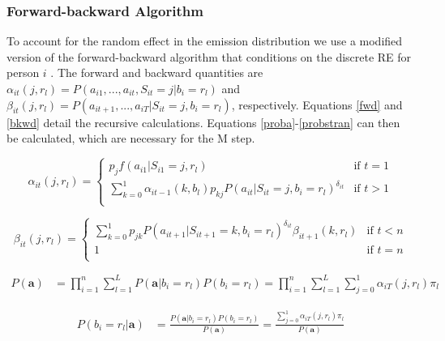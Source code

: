 \documentclass{article}
\begin{document}
\subsubsection{Forward-backward Algorithm}
To account for the random effect in the emission distribution we use a modified version of the forward-backward algorithm that conditions on the discrete RE for person $i$ \cite{Maruotti2011}. The forward and backward quantities are $\alpha_{it}(j,r_l) = P(a_{i1}, ..., a_{it}, S_{it} = j | b_i=r_l)$ and $\beta_{it}(j,r_l) =  P(a_{it+1}, ..., a_{iT} | S_{it} = j,b_i=r_l)$, respectively. Equations \ref{fwd} and \ref{bkwd} detail the recursive calculations. Equations \ref{proba}-\ref{probstran} can then be calculated, which are necessary for the M step.  
 
\begin{equation} \label{fwd}
\alpha_{it}(j,r_l) = \begin{cases}
    p_{j} f(a_{i1}|S_{i1}=j,r_l) & \text{if } t = 1 \\
    \sum_{k=0}^1 \alpha_{it-1} (k,b_l)p_{kj}P(a_{it}|S_{it}=j,b_i=r_l)^{\delta_{it}} 
        & \text{if } t > 1\\
\end{cases}
\end{equation}

\begin{equation} \label{bkwd}
\beta_{it}(j,r_l) = \begin{cases} 
    \sum_{k=0}^1p_{jk}P(a_{it+1}|S_{it+1}=k,b_i=r_l)^{\delta_{it}}\beta_{it+1}(k,r_l) 
        & \text{if } t < n \\
    1 & \text{if } t = n \\
\end{cases}
\end{equation}


\begin{equation}\label{proba}
\begin{split}
    P(\textbf{a}) & = \prod_{i=1}^n \sum_{l=1}^L 
        P(\textbf{a}|b_{i}=r_l)P(b_{i}=r_l) = 
    \prod_{i=1}^n \sum_{l=1}^L \sum_{j=0}^1 \alpha_{iT}(j,r_l)\pi_l 
\end{split}
\end{equation}

\begin{equation}\label{probl}
\begin{split}
    P(b_{i}=r_l|\textbf{a}) & = \frac{P(\textbf{a}|b_{i}=r_l)P(b_{i}=r_l)}{P(\textbf{a})} = 
    \frac{\sum_{j=0}^1 \alpha_{iT}(j,r_l)\pi_l }{P(\textbf{a})}  
\end{split}
\end{equation}
\end{document}
